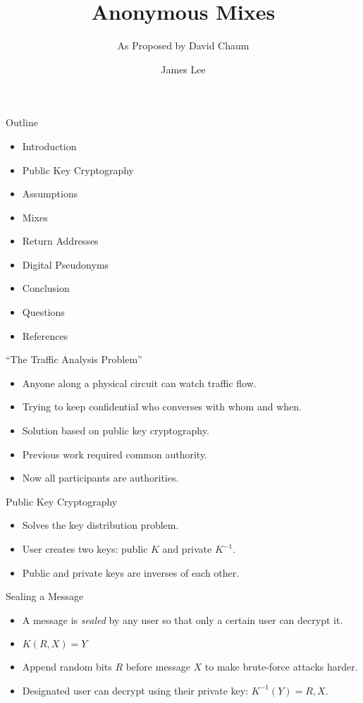 \documentclass[default,pdf,colorBG,slideColor]{prosper}
\title{Anonymous Mixes}
\subtitle{As Proposed by David Chaum}
\author{James Lee}
\begin{document}
\maketitle

\begin{slide}{Outline}
\begin{itemize}
\item Introduction
\item Public Key Cryptography
\item Assumptions
\item Mixes
\item Return Addresses
\item Digital Pseudonyms
\item Conclusion
\item Questions
\item References
\end{itemize}
\end{slide}

\begin{slide}{``The Traffic Analysis Problem''}
\begin{itemize}
\item Anyone along a physical circuit can watch traffic flow.
\item Trying to keep confidential who converses with whom and when.
\item Solution based on public key cryptography.
\item Previous work required common authority.
\item Now all participants are authorities.
\end{itemize}
\end{slide}

\begin{slide}{Public Key Cryptography}
\begin{itemize}
\item Solves the key distribution problem.
\item User creates two keys: public $K$ and private $K^{-1}$.
\item Public and private keys are inverses of each other.
\end{itemize}
\end{slide}

\begin{slide}{Sealing a Message}
\begin{itemize}
\item A message is \emph{sealed} by any user so that only a certain user can decrypt it.
\item $K(R, X)=Y$
\item Append random bits $R$ before message $X$ to make brute-force attacks harder.
\item Designated user can decrypt using their private key: $K^{-1}(Y)=R, X$.
\end{itemize}
\end{slide}
\end{document}
